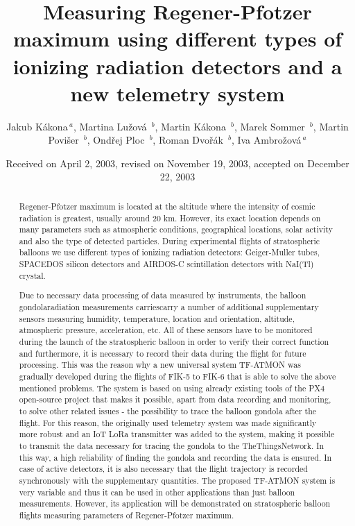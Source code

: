 \documentclass{Rpd}
\begin{document}
\def\Sectitle{Section Title}%

\def\copyrightyear{2021}%

\title[short Title]{Measuring Regener-Pfotzer maximum using different types of ionizing radiation detectors and a new telemetry system}
\author[\textit{et~al}]{Jakub Kákona\,$^{ a}$,  Martina Lužová \,$^{ b}$, Martin Kákona \,$^{ b}$, Marek Sommer \,$^{ b}$, Martin Povišer \,$^{ b}$, Ondřej Ploc \,$^{ b}$, Roman Dvořák \,$^{ b}$, Iva Ambrožová\,$^{ a}$}
\address{$^{ a}$CTU - Faculty of Electrical Engineering, $^{ b}$Ústav jaderné fyziky AV ČR, v. v. i.}

\date{Received on April 2, 2003, revised on November 19, 2003, accepted on December 22, 2003}

\begin{abstract}
Regener-Pfotzer maximum is located at the altitude where the intensity of cosmic radiation is greatest, usually around 20 km. However, its exact location depends on many parameters such as atmospheric conditions, geographical locations, solar activity and also the type of detected particles. During experimental flights of stratospheric balloons we use different types of ionizing radiation detectors: Geiger-Muller tubes, SPACEDOS silicon detectors and AIRDOS-C scintillation detectors with NaI(Tl) crystal.

Due to necessary data processing of data measured by instruments, the balloon gondolaradiation measurements carriescarry a number of additional supplementary sensors measuring humidity, temperature, location and orientation, altitude, atmospheric pressure, acceleration, etc. All of these sensors have to be monitored during the launch of the stratospheric balloon in order to verify their correct function and furthermore, it is necessary to record their data during the flight for future processing. This was the reason why a new universal system TF-ATMON was gradually developed during the flights of FIK-5 to FIK-6 that is able to solve the above mentioned problems. The system is based on using already existing tools of the PX4 open-source project that makes it possible, apart from data recording and monitoring, to solve other related issues - the possibility to trace the balloon gondola after the flight. For this reason, the originally used telemetry system was made significantly more robust and an IoT LoRa transmitter was added to the system, making it possible to transmit the data necessary for tracing the gondola to the TheThingsNetwork. In this way, a high reliability of finding the gondola and recording the data is ensured. In case of active detectors, it is also necessary that the flight trajectory is recorded synchronously with the supplementary quantities.
The proposed TF-ATMON system is very variable and thus it can be used in other applications than just balloon measurements. However, its application will be demonstrated on stratospheric balloon flights measuring parameters of Regener-Pfotzer maximum.

\end{abstract}
\end{document}
